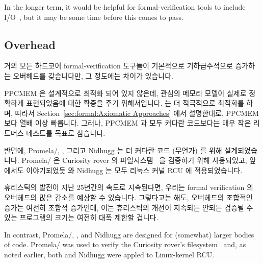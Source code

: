 In the longer term, it would be helpful for formal-verification
tools to include I/O~\cite{PaulEMcKenney2016LinuxKernelMMIO},
but it may be some time before this comes to pass.
\fi

\subsection{Overhead}
\label{sec:future:Overhead}

거의 모든 하드코어 formal-verification 도구들이 기본적으로 기하급수적으로
증가하는 오버헤드를 갖습니다만, 그 정도에는 차이가 있습니다.

PPCMEM 은 설계적으로 최적화 되어 있지 않은데, 관심의 메모리 모델이 실제로
정확하게 표현되었음에 대한 확증을 주기 위해서입니다.
 는 더 적극적으로 최적화를 하며, 따라서
Section~\ref{sec:formal:Axiomatic Approaches} 에서 설명한대로, PPCMEM 보다 열배
이상 빠릅니다.
그러나, PPCMEM 과  모두 커다란 코드보다는 매우 작은 리트머스 테스트를
목표로 삼습니다.
\iffalse

Almost all hard-core formal-verification tools are exponential
in nature, which might seem discouraging until you consider that
many of the most interesting software questions are in fact undecidable.
However, there are differences in degree, even among exponentials.

PPCMEM by design is unoptimized, in order to provide greater assurance
that the memory models of interest are in fact accurately represented.
The \co{herd} tool optimizes more aggressively, and so as described in
Section~\ref{sec:formal:Axiomatic Approaches}, is orders of magnitude
faster than PPCMEM.
Nevertheless, both PPCMEM and \co{herd} target very small litmus tests
rather than larger bodies of code.
\fi

반면에, Promela/, , 그리고 Nidhugg 는 더 커다란 코드 (무언가)
를 위해 설계되었습니다.
Promela/ 은 Curiosity rover 의
파일시스템~\cite{DBLP:journals/amai/GroceHHJX14} 을 검증하기 위해 사용되었고,
앞에서도 이야기되었듯  와 Nidhugg 는 모두 리눅스 커널 RCU 에
적용되었습니다.

휴리스틱의 발전이 지난 25년간의 속도로 지속된다면, 우리는 formal verification
의 오버헤드의 많은 감소를 예상할 수 있습니다.
그렇다고는 해도, 오버헤드의 조합적인 증가는 여전히 조합적 증가인데, 이는
휴리스틱의 개선이 지속되든 안되든 검증될 수 있는 프로그램의 크기는 여전히 대폭
제한할 겁니다.
\iffalse

In contrast, Promela/, , and Nidhugg are designed for
(somewhat) larger bodies of code.
Promela/ was used to verify the Curiosity rover's
filesystem~\cite{DBLP:journals/amai/GroceHHJX14} and, as noted earlier,
both  and Nidhugg were appled to Linux-kernel RCU.

